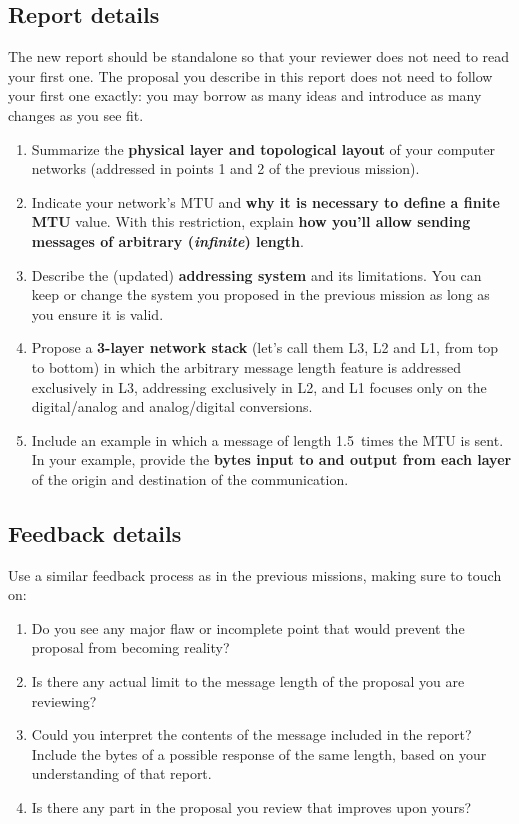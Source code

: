 \subsection*{Report details}
The new report should be standalone so that your reviewer does not need to read your first one.
The proposal you describe in this report does not need to follow your first one exactly: you may borrow as many ideas and introduce as many changes as you see fit.
%
\begin{enumerate}[itemsep=0.1cm]
\item Summarize the \textbf{physical layer and topological layout} of your computer networks (addressed in points 1 and 2 of the previous mission).

\item Indicate your network's MTU and \textbf{why it is necessary to define a finite MTU} value. With this restriction, explain \textbf{how you'll allow sending messages of arbitrary (\textit{infinite}) length}.

\item Describe the (updated) \textbf{addressing system} and its limitations. You can keep or change the system you proposed in the previous mission as long as you ensure it is valid.

\item Propose a \textbf{3-layer network stack} (let's call them L3, L2 and L1, from top to bottom) in which the arbitrary message length feature is addressed exclusively in L3, addressing exclusively in L2, and L1 focuses only on the digital/analog and analog/digital conversions.

\item Include an example in which a message of length 1.5~times the MTU is sent. In your example, provide the \textbf{bytes input to and output from each layer} of the origin and destination of the communication.
\end{enumerate}

\subsection*{Feedback details}

Use a similar feedback process as in the previous missions, making sure to touch on:
\begin{enumerate}[itemsep=0.1cm]
\item Do you see any major flaw or incomplete point that would prevent the proposal from becoming reality?
\item Is there any actual limit to the message length of the proposal you are reviewing?
\item Could you interpret the contents of the message included in the report? Include the bytes of a possible response of the same length, based on your understanding of that report.
\item Is there any part in the proposal you review that improves upon yours?
\end{enumerate}

